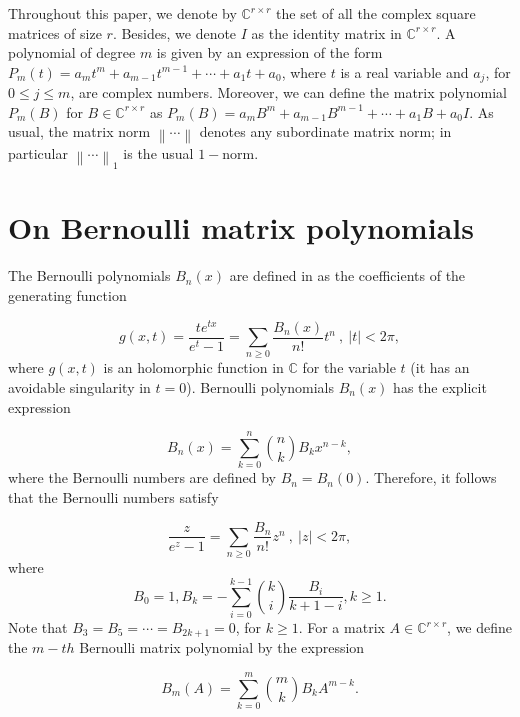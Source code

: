  Throughout this paper, we denote by $\mathbb{C}^{r \times r}$ the set of all the complex square matrices of size $r$. Besides, we denote $I$ as the identity matrix in $ \mathbb{C}^{r \times r}$. A polynomial of degree $m$ is given by an expression of the form $P_m(t)=a_{m} t^m+a_{m-1}t^{m-1}+\cdots+a_{1}t+a_{0}$, where $t$ is a real variable and $a_j$, for $0\leq j \leq m$, are complex numbers. Moreover, we can define the matrix polynomial $P_m(B)$ for $B \in \mathbb{C}^{r \times r}$  as $P_m(B)=a_{m} B^m+a_{m-1}B^{m-1}+\cdots+a_{1}B+a_{0}I$.  As usual, the matrix norm $\left\|\cdots \right\|$ denotes any subordinate matrix norm; in particular $\left\| \cdots \right\|_{1}$ is the usual $1-$norm.

\section{On Bernoulli matrix polynomials}\label{section2}
The Bernoulli polynomials $B_n(x)$ are defined in \cite[p.588]{olver2010nist} as the coefficients of the generating function

\begin{equation}\label{Bernoulli1}
g(x, t)= \frac{t e^{tx}}{e^t-1}=\sum_{n \geq 0} \frac{B_n(x)}{n!}t^n  \ , \ |t|<2\pi,
\end{equation}
where $g(x, t)$ is an holomorphic function in $\mathbb{C}$ for the variable $t$ (it has an avoidable singularity in $t=0$). Bernoulli polynomials  $B_n(x)$ has the explicit expression

\begin{equation}\label{Bernoulli2}
B_n(x)=\sum_{k=0}^{n} {n \choose k} B_k x^{n-k},
\end{equation}
where the Bernoulli numbers are defined by $B_n=B_n(0)$. Therefore, it follows that the Bernoulli numbers satisfy

\begin{equation}\label{Bernoulli3}
\frac{z}{e^z-1}=\sum_{n \geq 0} \frac{B_n}{n!}z^n  \ , \ |z|<2\pi,
\end{equation}
where
\begin{equation}\label{Bernoulli3a}
B_0=1, \displaystyle  B_{k}= -\sum_{i=0}^{k-1} {k \choose i} \frac{B_i}{k+1-i}, k \geq 1.
\end{equation}
Note that $ B_{3}=B_{5}=\cdots=B_{2k+1}=0$, for
$k\geq 1$. For a matrix $A \in \mathbb{C}^{r \times r}$, we define the $m-th$ Bernoulli matrix polynomial by the expression

\begin{equation}\label{Bernoulli2matrix}
B_m(A)=\sum_{k=0}^{m} {m \choose k} B_k A^{m-k}.
\end{equation}

